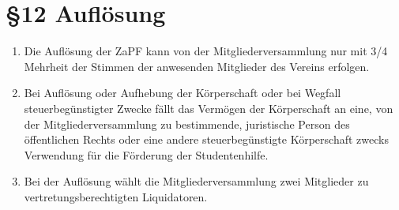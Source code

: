 \documentclass[ngerman]{article}
\begin{document}
\section*{§12 Auflösung}
\begin{enumerate}
 \item Die Auflösung der ZaPF kann von der Mitgliederversammlung nur mit 3/4 Mehrheit der Stimmen der anwesenden Mitglieder des Vereins erfolgen.
 \item Bei Auflösung oder Aufhebung der Körperschaft oder bei Wegfall steuerbegünstigter Zwecke fällt das Vermögen der Körperschaft an eine, von der Mitgliederversammlung zu bestimmende, juristische Person des öffentlichen Rechts oder eine andere steuerbegünstigte Körperschaft zwecks Verwendung für die Förderung der Studentenhilfe.
 \item Bei der Auflösung wählt die Mitgliederversammlung zwei Mitglieder zu vertretungsberechtigten Liquidatoren.
\end{enumerate}
\end{document}

